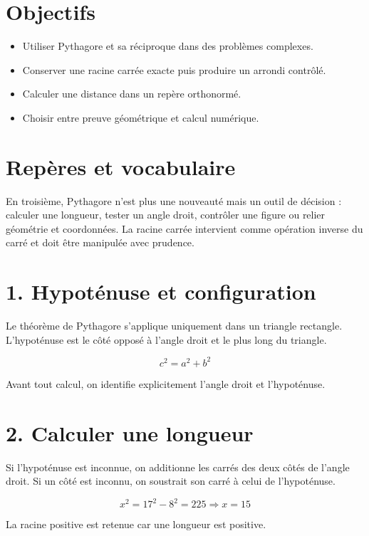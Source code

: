 
\section{Objectifs}
\begin{itemize}
\item Utiliser Pythagore et sa réciproque dans des problèmes complexes.
\item Conserver une racine carrée exacte puis produire un arrondi contrôlé.
\item Calculer une distance dans un repère orthonormé.
\item Choisir entre preuve géométrique et calcul numérique.
\end{itemize}

\section{Repères et vocabulaire}
En troisième, Pythagore n’est plus une nouveauté mais un outil de décision : calculer une longueur, tester un angle droit, contrôler une figure ou relier géométrie et coordonnées. La racine carrée intervient comme opération inverse du carré et doit être manipulée avec prudence.

\section{1. Hypoténuse et configuration}
Le théorème de Pythagore s’applique uniquement dans un triangle rectangle. L’hypoténuse est le côté opposé à l’angle droit et le plus long du triangle.

\[
c^2=a^2+b^2
\]

\begin{exemple}
Avant tout calcul, on identifie explicitement l’angle droit et l’hypoténuse.
\end{exemple}

\section{2. Calculer une longueur}
Si l’hypoténuse est inconnue, on additionne les carrés des deux côtés de l’angle droit. Si un côté est inconnu, on soustrait son carré à celui de l’hypoténuse.

\[
x^2=17^2-8^2=225\Rightarrow x=15
\]

\begin{exemple}
La racine positive est retenue car une longueur est positive.
\end{exemple}

